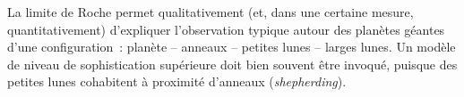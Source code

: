 \sk
La limite de Roche permet qualitativement (et, dans une certaine mesure, quantitativement) d'expliquer l'observation typique autour des planètes géantes d'une configuration~: planète -- anneaux -- petites lunes -- larges lunes. Un modèle de niveau de sophistication supérieure doit bien souvent être invoqué, puisque des petites lunes cohabitent à proximité d'anneaux (\emph{shepherding}).

